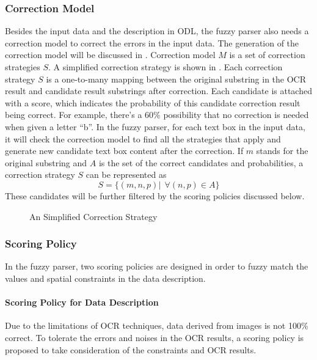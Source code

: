 \subsubsection{Correction Model}
\label{sec:corrmodel}
Besides the input data and the description in ODL, the fuzzy parser 
also needs a correction model to correct the errors in the input data. 
The generation of the correction model will be discussed in 
. Correction model $M$ is a set of correction 
strategies $S$. 
A simplified correction strategy is shown in . 
Each correction strategy $S$ is a one-to-many mapping between 
the original substring in the OCR result and candidate result substrings 
after correction. Each candidate is attached with a score, 
which indicates the probability of this candidate correction result being 
correct. For example, there's a 60\% 
possibility that no correction is needed when given a letter ``b''.  
In the fuzzy parser, for each text box in the input data, it will check 
the correction model to find all the strategies that apply
and generate new candidate text box content after the correction. 
If $m$ stands for the original substring and $A$ is the 
set of the correct candidates and probabilities, 
a correction strategy $S$ can be represented as 
\begin{equation}
S=\{(m, n, p)|~~\forall (n, p) \in A\}
\end{equation}
These candidates will be further filtered by the scoring policies 
discussed below. 

\begin{figure}
\centering
{}
\caption{An Simplified Correction Strategy}
\label{fig:corrstrategy}
\end{figure}

\subsubsection{Scoring Policy}
\label{sec:score}
In the fuzzy parser, two scoring policies are designed 
in order to fuzzy match
the values and spatial constraints in the data description.

\paragraph{Scoring Policy for Data Description}
Due to the limitations of OCR techniques, data derived from images is not 100\% 
correct. To tolerate the errors and noises in the OCR results, a scoring 
policy is proposed to take consideration of the constraints and OCR results. 

